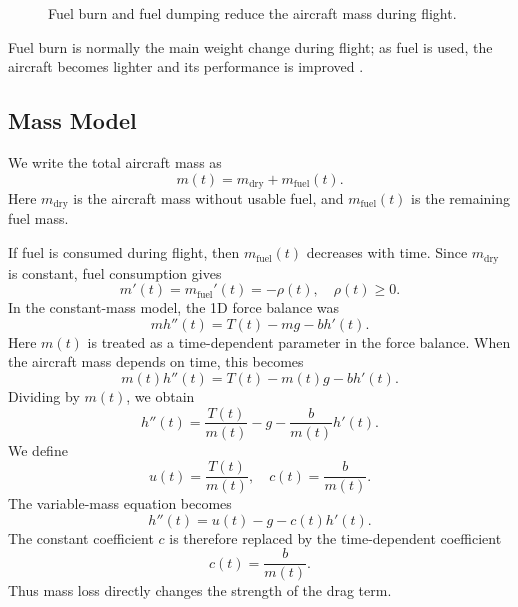 ﻿\documentclass[12pt]{article}
\begin{document}
\begin{figure}[h]
\centering
{}
\caption{Fuel burn and fuel dumping reduce the aircraft mass during flight.}
\label{fig:aircraft-fuel-dumping}
\end{figure}
Fuel burn is normally the main weight change during flight; as fuel is used, the aircraft becomes lighter and its performance is improved \cite{stevens_lewis_johnson_aircraft_control_2015}.

\subsection{Mass Model}
We write the total aircraft mass as
\[
 m(t) = m_{\mathrm{dry}} + m_{\mathrm{fuel}}(t).
\]
Here $m_{\mathrm{dry}}$ is the aircraft mass without usable fuel, and $m_{\mathrm{fuel}}(t)$ is the remaining fuel mass.

If fuel is consumed during flight, then $m_{\mathrm{fuel}}(t)$ decreases with time. 
Since $m_{\mathrm{dry}}$ is constant, fuel consumption gives
\[
 m'(t) = m_{\mathrm{fuel}}'(t) = -\rho(t),\quad \rho(t)\ge 0.
\]
In the constant-mass model, the 1D force balance was
\[
 m h''(t) = T(t) - mg - bh'(t).
\]
Here $m(t)$ is treated as a time-dependent parameter in the force balance. 
When the aircraft mass depends on time, this becomes
\[
 m(t)h''(t) = T(t) - m(t)g - bh'(t).
\]
Dividing by $m(t)$, we obtain
\[
 h''(t) = \frac{T(t)}{m(t)} - g - \frac{b}{m(t)}h'(t).
\]
We define
\[
 u(t) = \frac{T(t)}{m(t)},\quad c(t) = \frac{b}{m(t)}.
\]
The variable-mass equation becomes
\[
 \boxed{ h''(t) = u(t) - g - c(t)h'(t). }
\]
The constant coefficient $c$ is therefore replaced by the time-dependent coefficient
\[
 c(t) = \frac{b}{m(t)}.
\]
Thus mass loss directly changes the strength of the drag term.
\end{document}
